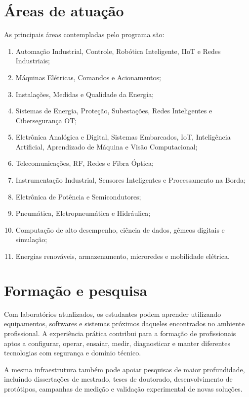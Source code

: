 \documentclass[12pt,a4paper]{article}
\begin{document}
\section{Áreas de atuação}
As principais áreas contempladas pelo programa são:
\begin{enumerate}[leftmargin=*]
\item Automação Industrial, Controle, Robótica Inteligente, IIoT e Redes Industriais;
\item Máquinas Elétricas, Comandos e Acionamentos;
\item Instalações, Medidas e Qualidade da Energia;
\item Sistemas de Energia, Proteção, Subestações, Redes Inteligentes e Cibersegurança OT;
\item Eletrônica Analógica e Digital, Sistemas Embarcados, IoT, Inteligência Artificial, Aprendizado de Máquina e Visão Computacional;
\item Telecomunicações, RF, Redes e Fibra Óptica;
\item Instrumentação Industrial, Sensores Inteligentes e Processamento na Borda;
\item Eletrônica de Potência e Semicondutores;
\item Pneumática, Eletropneumática e Hidráulica;
\item Computação de alto desempenho, ciência de dados, gêmeos digitais e simulação;
\item Energias renováveis, armazenamento, microredes e mobilidade elétrica.
\end{enumerate}





\section{Formação e pesquisa}
Com laboratórios atualizados, os estudantes podem aprender utilizando equipamentos, softwares e sistemas próximos daqueles encontrados no ambiente profissional. A experiência prática contribui para a formação de profissionais aptos a configurar, operar, ensaiar, medir, diagnosticar e manter diferentes tecnologias com segurança e domínio técnico.

A mesma infraestrutura também pode apoiar pesquisas de maior profundidade, incluindo dissertações de mestrado, teses de doutorado, desenvolvimento de protótipos, campanhas de medição e validação experimental de novas soluções.
\end{document}
